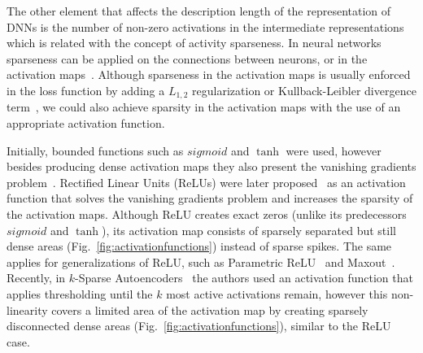 \documentclass[journal]{IEEEtran}
\begin{document}
The other element that affects the description length of the representation of DNNs is the number of non-zero activations in the intermediate representations which is related with the concept of activity sparseness.
In neural networks sparseness can be applied on the connections between neurons, or in the activation maps~\cite{laughlin2003communication}.
Although sparseness in the activation maps is usually enforced in the loss function by adding a $L_{1, 2}$ regularization or Kullback-Leibler divergence term~\cite{kingma2013auto}, we could also achieve sparsity in the activation maps with the use of an appropriate activation function.

Initially, bounded functions such as $sigmoid$ and $\tanh$ were used, however besides producing dense activation maps they also present the vanishing gradients problem~\cite{bengio1994learning}.
Rectified Linear Units (ReLUs) were later proposed~\cite{glorot2011deep, nair2010rectified} as an activation function that solves the vanishing gradients problem and increases the sparsity of the activation maps.
Although ReLU creates exact zeros (unlike its predecessors $sigmoid$ and $\tanh$), its activation map consists of sparsely separated but still dense areas (Fig.~\ref{fig:activationfunctions}) instead of sparse spikes.
The same applies for generalizations of ReLU, such as Parametric ReLU~\cite{he2015delving} and Maxout~\cite{goodfellow2013maxout}.
Recently, in $k$-Sparse Autoencoders~\cite{makhzani2013k} the authors used an activation function that applies thresholding until the $k$ most active activations remain, however this non-linearity covers a limited area of the activation map by creating sparsely disconnected dense areas (Fig.~\ref{fig:activationfunctions}), similar to the ReLU case.
\end{document}
